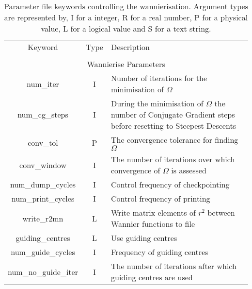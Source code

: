 \begin{table}
\begin{center}
\begin{tabular}{|c|c|p{6cm}|}
\hline
Keyword & Type & Description \\
        &      &             \\
\hline\hline
\multicolumn{3}{|c|}{Wannierise Parameters} \\
\hline
{\sc num\_iter }   & I & Number of iterations for the minimisation
of $\Omega$ \\
{\sc num\_cg\_steps }   & I & During the minimisation
of $\Omega$ the number of Conjugate Gradient steps before resetting to
Steepest Descents \\
{\sc conv\_tol }   & P &The convergence tolerance for finding $\Omega$  \\
{\sc conv\_window }   & I & The number of iterations over which
convergence of $\Omega$ is assessed \\
{\sc num\_dump\_cycles }   & I & Control frequency of checkpointing \\
{\sc num\_print\_cycles }   & I & Control frequency of printing \\
{\sc write\_r2mn }   & L & Write matrix elements of $r^2$ between
Wannier functions to file \\
{\sc guiding\_centres }   & L & Use guiding centres \\
{\sc num\_guide\_cycles }   & I & Frequency of guiding centres \\
{\sc num\_no\_guide\_iter }   & I & The number of iterations
after which guiding centres are used\\
\hline
\end{tabular}
\caption[Parameter file keywords controlling the Wannierise routine.]
{Parameter file keywords controlling the wannierisation.  Argument types
are represented by, I for a integer, R for a real number, P for a
physical value, L for a logical value and S for a text string.}
\label{parameter_keywords5}
\end{center}
\end{table}



